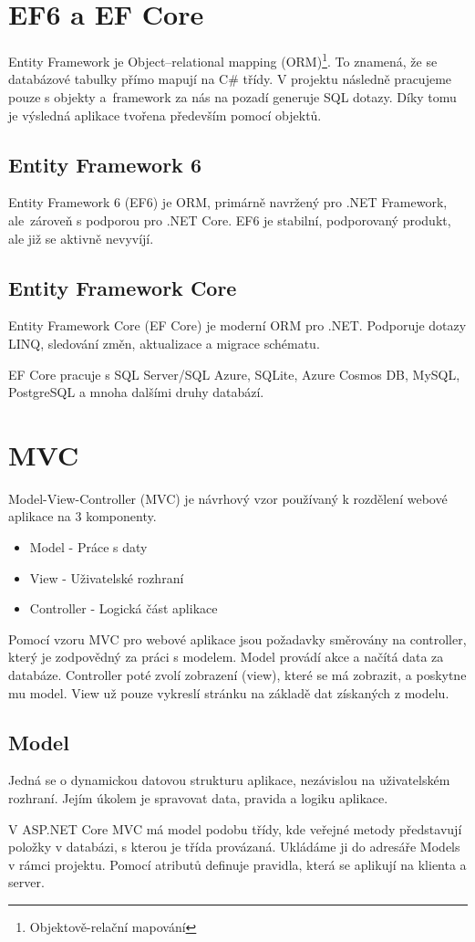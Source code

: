 \documentclass[a4paper, 12pt]{report}
\begin{document}
		\section{EF6 a EF Core}
        Entity Framework je Object–relational mapping (ORM)\footnote{Objektově-relační mapování}. To znamená, že se databázové tabulky přímo mapují na C\# třídy. V projektu následně pracujeme pouze s objekty a~framework za nás na pozadí generuje SQL dotazy. Díky tomu je výsledná aplikace tvořena především pomocí objektů.\cite{ASP.NET_Lekce8}
			\subsection{Entity Framework 6}
            Entity Framework 6 (EF6) je ORM, primárně navržený pro .NET Framework, ale~zároveň s podporou pro .NET Core. EF6 je stabilní, podporovaný produkt, ale již se aktivně nevyvíjí.\cite{EF6_EFCore}
			\subsection{Entity Framework Core}
			Entity Framework Core (EF Core) je moderní ORM pro .NET. Podporuje dotazy LINQ, sledování změn, aktualizace a migrace schématu.\par EF Core pracuje s SQL Server/SQL Azure, SQLite, Azure Cosmos DB, MySQL, PostgreSQL a mnoha dalšími druhy databází.\cite{EF6_EFCore}

		\section{MVC}
		Model-View-Controller (MVC) je návrhový vzor používaný k rozdělení webové aplikace na 3 komponenty.
		\begin{itemize}
			\item Model - Práce s daty
			\item View - Uživatelské rozhraní
			\item Controller - Logická část aplikace
		\end{itemize}\par
		Pomocí vzoru MVC pro webové aplikace jsou požadavky směrovány na controller, který je zodpovědný za práci s modelem. Model provádí akce a načítá data za databáze. Controller poté zvolí zobrazení (view), které se má zobrazit, a poskytne mu model. View už pouze vykreslí stránku na základě dat získaných z modelu.\cite{MVC}
			\subsection{Model} \label{Model_teorie}
			Jedná se o dynamickou datovou strukturu aplikace, nezávislou na uživatelském rozhraní. Jejím úkolem je spravovat data, pravida a logiku aplikace. \par
			V ASP.NET Core MVC má model podobu třídy, kde veřejné metody představují položky v databázi, s kterou je třída provázaná. Ukládáme ji do adresáře Models v rámci projektu. Pomocí atributů definuje pravidla, která se aplikují na klienta a server.\cite{MVC_Wiki_EN}
\end{document}
